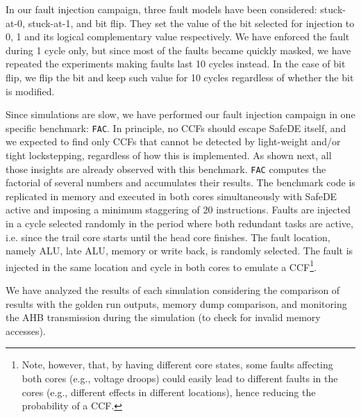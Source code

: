 In our fault injection campaign, three fault models have been considered: stuck-at-0, stuck-at-1, and bit flip. They set the value of the bit selected for injection to 0, 1 and its logical complementary value respectively. We have enforced the fault during 1 cycle only, but since most of the faults became quickly masked, we have repeated the experiments making faults last 10 cycles instead. In the case of bit flip, we flip the bit and keep such value for 10 cycles regardless of whether the bit is modified.

Since simulations are slow, we have performed our fault injection campaign in one specific benchmark: \texttt{FAC}. In principle, no CCFs should escape SafeDE itself, and we expected to find only CCFs that cannot be detected by light-weight and/or tight lockstepping, regardless of how this is implemented. As shown next, all those insights are already observed with this benchmark.
\texttt{FAC} 
computes the factorial of several numbers and accumulates their results.
The benchmark code is replicated in memory and executed in both cores simultaneously with SafeDE active and imposing a minimum staggering of 20 instructions. 
Faults are injected in a cycle selected randomly in the period where both redundant tasks are active, i.e. since the trail core starts until the head core finishes.
The fault location, namely ALU, late ALU, memory or write back, is randomly selected. The fault is injected in the same location and cycle in both cores to emulate a CCF\footnote{Note, however, that, by having different core states, some faults affecting both cores (e.g., voltage droops) could easily lead to different faults in the cores (e.g., different effects in different locations), hence reducing the probability of a CCF.}. 

We have analyzed the results of each simulation considering the comparison of
results with the golden run outputs, memory dump comparison, and monitoring the AHB transmission during the simulation (to check for invalid memory accesses).


